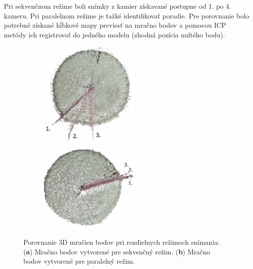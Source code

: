 Pri sekvenčnom režime boli snímky z kamier získavané postupne od 1. po 4. kameru. Pri paralelnom režime je ťažké identifikovať poradie. Pre porovnanie bolo potrebné získané hĺbkové mapy previesť na mračno bodov a pomocou ICP metódy ich registrovať do jedného modelu (zhodná pozícia nultého bodu). 

\begin{figure}[h]
	\centering
	\begin{subfigure}[b]{0.44\textwidth}
		\centering
		\includegraphics[width=5cm]{figures/dynamic_result_seq.png}
		\caption{}
		\label{fig:dynamic:a}
	\end{subfigure}
	\hskip 8pt 
	\begin{subfigure}[b]{0.44\textwidth}
		\centering
		\includegraphics[width=5cm]{figures/dynamic_result_par.png}
		\caption{}
		\label{fig:dynamic:b}
	\end{subfigure}
	\caption{Porovnanie 3D mračien bodov pri rozdielnych režimoch snímania: (\textbf{a}) Mračno bodov vytvorené pre sekvenčný režim. (\textbf{b}) Mračno bodov vytvorené pre paralelný režim.}
	\label{fig:dynamic}
\end{figure}


